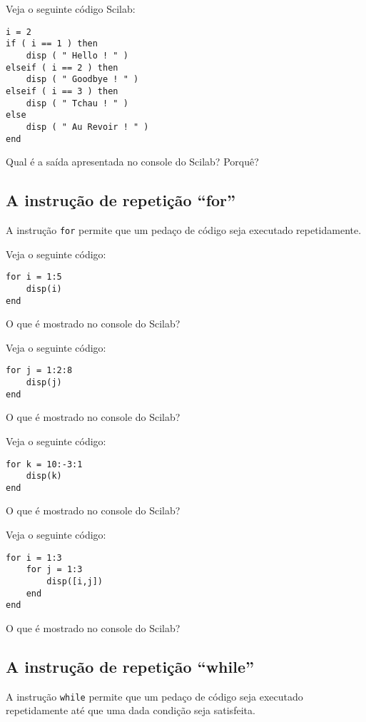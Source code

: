 \documentclass[main.tex]{subfiles}
\begin{document}
\begin{ex}
  Veja o seguinte código Scilab:
\begin{verbatim}
i = 2
if ( i == 1 ) then
    disp ( " Hello ! " )
elseif ( i == 2 ) then
    disp ( " Goodbye ! " )
elseif ( i == 3 ) then
    disp ( " Tchau ! " )
else
    disp ( " Au Revoir ! " )
end
\end{verbatim}
Qual é a saída apresentada no console do Scilab? Porquê?
\end{ex}

\subsection{A instrução de repetição ``for''}

A instrução \verb+for+ permite que um pedaço de código seja executado repetidamente.

\begin{ex}
  Veja o seguinte código:
\begin{verbatim}
for i = 1:5
    disp(i)
end
\end{verbatim}
O que é mostrado no console do Scilab?
\end{ex}

\begin{ex}
  Veja o seguinte código:
\begin{verbatim}
for j = 1:2:8
    disp(j)
end
\end{verbatim}
O que é mostrado no console do Scilab?
\end{ex}

\begin{ex}
  Veja o seguinte código:
\begin{verbatim}
for k = 10:-3:1
    disp(k)
end
\end{verbatim}
O que é mostrado no console do Scilab?
\end{ex}

\begin{ex}
  Veja o seguinte código:
\begin{verbatim}
for i = 1:3
    for j = 1:3
        disp([i,j])
    end
end
\end{verbatim}
O que é mostrado no console do Scilab?
\end{ex}

\subsection{A instrução de repetição ``while''}

A instrução \verb+while+ permite que um pedaço de código seja executado repetidamente até que uma dada condição seja satisfeita.
\end{document}
